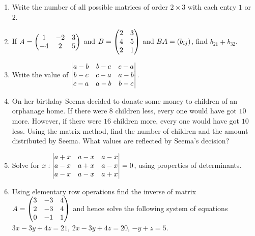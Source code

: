 \begin{enumerate}
\item Write the number of all possible matrices of order $2 \times 3$ with each entry $1$ or $2$.
\item If $A = \begin{pmatrix}1 & -2 & 3 \\ -4 & 2 & 5\end{pmatrix}$ and $B = \begin{pmatrix}2 & 3 \\ 4 & 5 \\ 2 & 1\end{pmatrix}$ and $BA = \left(b_{ij}\right)$, find $b_{21} + b_{32}$.
\item Write the value of $\begin{vmatrix}{a-b} & {b-c} & {c-a} \\ {b-c} & {c-a} & {a-b}\\ {c-a} & {a-b} & {b-c}\end{vmatrix}$.
\item On her birthday Seema decided to donate some money to children of an orphanage home. If there were $8$ children less, every one would have got \rupee$10$ more. However, if there were $16$ children more, every one would have got \rupee$10$ less. Using the matrix method, find the number of children and the amount distributed by Seema. What values are reflected by Seema's decision?
\item Solve for $x : \begin{vmatrix}a+x & a-x & a-x \\ a-x & a+x & a-x \\ a-x & a-x & a+x\end{vmatrix} = 0$, using properties of determinants.
\item Using elementary row operations find the inverse of matrix $A = \begin{pmatrix}3 & -3 & 4 \\ 2 & -3 & 4\\ 0 & -1 & 1\end{pmatrix}$ and hence solve the following system of equations $ 3x - 3y + 4z = 21$, $2x - 3y + 4z = 20$, $-y + z = 5$.
\end{enumerate}
